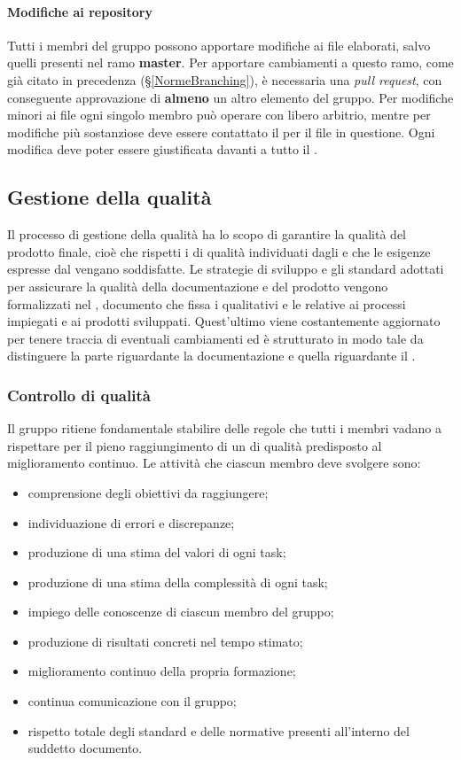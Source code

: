 {{\paragraph*{Modifiche ai repository}
Tutti i membri del gruppo possono apportare modifiche ai file elaborati, salvo quelli presenti nel ramo \textbf{master}. Per apportare cambiamenti a questo ramo, come già citato in precedenza (\S{}\ref{NormeBranching}), è necessaria una \textit{pull request}, con conseguente approvazione di \textbf{almeno} un altro elemento del gruppo.\newline
Per modifiche minori ai file ogni singolo membro può operare con libero arbitrio, mentre per modifiche più sostanziose deve essere contattato il \RdP{} per il file in questione.\newline
Ogni modifica deve poter essere giustificata davanti a tutto il .
\newpage
\subsection{Gestione della qualità}

Il processo di gestione della qualità ha lo scopo di garantire la qualità del prodotto finale, cioè che rispetti i  di qualità individuati dagli  e che le esigenze espresse dal  vengano soddisfatte. Le strategie di sviluppo e gli standard adottati per assicurare la qualità della documentazione e del prodotto vengono formalizzati nel \PdQ{}, documento che fissa i  qualitativi e le  relative ai processi impiegati e ai prodotti sviluppati. Quest'ultimo viene costantemente aggiornato per tenere traccia di eventuali cambiamenti ed è strutturato in modo tale da distinguere la parte riguardante la documentazione e quella riguardante il .
\subsubsection{Controllo di qualità}
Il gruppo \textit{\Gruppo{}} ritiene fondamentale stabilire delle regole che tutti i membri vadano a rispettare per il pieno raggiungimento di un  di qualità predisposto al miglioramento continuo.
Le attività che ciascun membro deve svolgere sono:
\begin{itemize}
	\item comprensione degli obiettivi da raggiungere;
	\item individuazione di errori e discrepanze;
	\item produzione di una stima del valori di ogni task;
	\item produzione di una stima della complessità di ogni task;
	\item impiego delle conoscenze di ciascun membro del gruppo;
	\item produzione di risultati concreti nel tempo stimato;
	\item miglioramento continuo della propria formazione;
	\item continua comunicazione con il gruppo;
	\item rispetto totale degli standard e delle normative presenti all'interno del suddetto documento.
\end{itemize} 
}}
